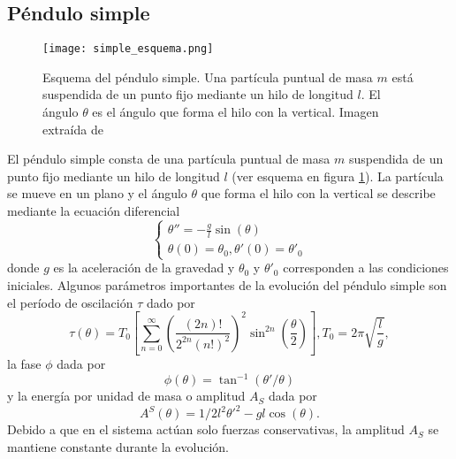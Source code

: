 \documentclass[aps,prb,twocolumn,superscriptaddress,floatfix,longbibliography,10pt]{revtex4-2}
\newif\ifptitle
\newif\ifpnumber
\newcounter{para}
\newcommand\ptitle[1]{\par\refstepcounter{para}
{\ifpnumber{\noindent\textcolor{lightgray}{\textbf{\thepara}}\indent}\fi}
{\ifptitle{\textbf{[{#1}]}}\fi}}
\begin{document}
\subsection{Péndulo simple}

\ptitle{Presentar ecuaciones de la dinámica}

\begin{figure}[h]
  \texttt{[image: simple\_esquema.png]}
  \caption{Esquema del péndulo simple. Una partícula puntual de masa $m$ está suspendida de un punto fijo mediante un hilo de longitud $l$. El ángulo $\theta$ es el ángulo que forma el hilo con la vertical. Imagen extraída de \cite{esquema_pendulo_simple}}
   \label{fig:simple_esquema}
\end{figure}
% 

El péndulo simple consta de una partícula puntual de masa $m$ suspendida de un punto fijo mediante un hilo de longitud $l$ (ver esquema en figura \ref{fig:simple_esquema}). La partícula se mueve en un plano y el ángulo $\theta$ que forma el hilo con la vertical se describe mediante la ecuación diferencial
\begin{equation}
  \left\{\begin{matrix}
    \theta'' = -\frac{g}{l} \sin{(\theta)} \\
    \theta(0) = \theta_0, \theta'(0) = \theta'_0
   \end{matrix}\right.
  \label{eq:pendulo_simple}
\end{equation}
donde $g$ es la aceleración de la gravedad y $\theta_0$ y $\theta'_0$ corresponden a las condiciones iniciales. Algunos parámetros importantes de la evolución del péndulo simple son el período de oscilación $\tau$ dado por \cite{periodo_exacto_pendulo_simple}
\begin{equation}
  \tau(\theta) = T_0 \left [ \sum_{n = 0}^\infty \left(  \frac{(2n)!}{2^{2n}(n!)^2} \right )^2 \sin^{2n} \left ( \frac{\theta}{2} \right )   \right ], T_0 = 2 \pi \sqrt{\frac{l}{g}},
  \label{eq:periodo_simple}
\end{equation}
la fase $\phi$ dada por
\begin{equation}
  \phi(\theta) = \tan^{-1}(\theta'/\theta)
  \label{eq:fase_simple}
\end{equation}
y la energía por unidad de masa o amplitud $A_S$ dada por
\begin{equation}
  A^S(\theta) = 1/2 l^2 \theta'^2 - g l \cos{(\theta)}.
  \label{eq:amplitud_simple}
\end{equation}
Debido a que en el sistema actúan solo fuerzas conservativas, la amplitud $A_S$ se mantiene constante durante la evolución.
\end{document}
